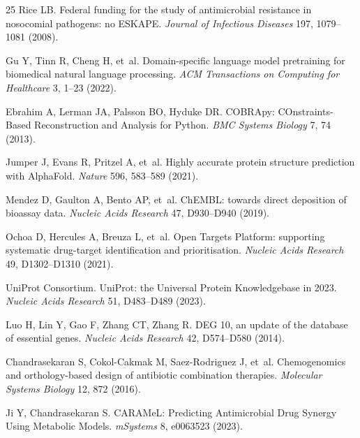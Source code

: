 \documentclass[12pt,a4paper]{article}
\begin{document}
\begin{thebibliography}{25}
Rice LB.
\newblock Federal funding for the study of antimicrobial resistance in nosocomial pathogens: no ESKAPE.
\newblock \textit{Journal of Infectious Diseases} 197, 1079--1081 (2008).

Gu Y, Tinn R, Cheng H, et~al.
\newblock Domain-specific language model pretraining for biomedical natural language processing.
\newblock \textit{ACM Transactions on Computing for Healthcare} 3, 1--23 (2022).

Ebrahim A, Lerman JA, Palsson BO, Hyduke DR.
\newblock COBRApy: COnstraints-Based Reconstruction and Analysis for Python.
\newblock \textit{BMC Systems Biology} 7, 74 (2013).

Jumper J, Evans R, Pritzel A, et~al.
\newblock Highly accurate protein structure prediction with AlphaFold.
\newblock \textit{Nature} 596, 583--589 (2021).

Mendez D, Gaulton A, Bento AP, et~al.
\newblock ChEMBL: towards direct deposition of bioassay data.
\newblock \textit{Nucleic Acids Research} 47, D930--D940 (2019).

Ochoa D, Hercules A, Breuza L, et~al.
\newblock Open Targets Platform: supporting systematic drug-target identification and prioritisation.
\newblock \textit{Nucleic Acids Research} 49, D1302--D1310 (2021).

UniProt Consortium.
\newblock UniProt: the Universal Protein Knowledgebase in 2023.
\newblock \textit{Nucleic Acids Research} 51, D483--D489 (2023).

Luo H, Lin Y, Gao F, Zhang CT, Zhang R.
\newblock DEG 10, an update of the database of essential genes.
\newblock \textit{Nucleic Acids Research} 42, D574--D580 (2014).

Chandrasekaran S, Cokol-Cakmak M, Saez-Rodriguez J, et~al.
\newblock Chemogenomics and orthology-based design of antibiotic combination therapies.
\newblock \textit{Molecular Systems Biology} 12, 872 (2016).

Ji Y, Chandrasekaran S.
\newblock CARAMeL: Predicting Antimicrobial Drug Synergy Using Metabolic Models.
\newblock \textit{mSystems} 8, e0063523 (2023).


\end{thebibliography}
\end{document}

